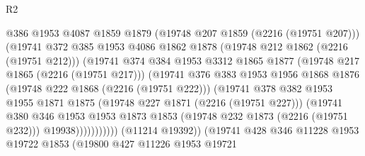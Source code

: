 \begin{lexlean}{R2}
\begin{coremodule}
                                @386
                                @1953
                                @4087
                                @1859
                                @1879
                                (@19748 @207 @1859 (@2216 (@19751 @207)))
                                (@19741
                                  @372
                                  @385
                                  @1953
                                  @4086
                                  @1862
                                  @1878
                                  (@19748 @212 @1862 (@2216 (@19751 @212)))
                                  (@19741
                                    @374
                                    @384
                                    @1953
                                    @3312
                                    @1865
                                    @1877
                                    (@19748 @217 @1865 (@2216 (@19751 @217)))
                                    (@19741
                                      @376
                                      @383
                                      @1953
                                      @1956
                                      @1868
                                      @1876
                                      (@19748 @222 @1868 (@2216 (@19751 @222)))
                                      (@19741
                                        @378
                                        @382
                                        @1953
                                        @1955
                                        @1871
                                        @1875
                                        (@19748 @227 @1871 (@2216 (@19751 @227)))
                                        (@19741
                                          @380
                                          @346
                                          @1953
                                          @1953
                                          @1873
                                          @1853
                                          (@19748 @232 @1873 (@2216 (@19751 @232)))
                                          @19938)))))))))))
                    (@11214 @19392))
                  (@19741
                    @428
                    @346
                    @11228
                    @1953
                    @19722
                    @1853
                    (@19800
                      @427
                      @11226
                      @1953
                      @19721

\end{coremodule}
\end{lexlean}
